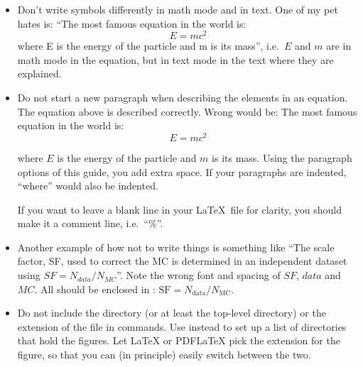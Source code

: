 \begin{itemize}
\item Don't write symbols differently in math mode and in text. One of
  my pet hates is:
  \enquote{The most famous equation in the world is:
  \begin{equation}
    \label{eq:emc1}
    E = m c^{2}
  \end{equation}
  where E is the energy of the particle and m is its mass}, i.e.\ \(E\)
  and \(m\) are in math mode in the equation, but in text mode in the
  text where they are explained.

\item Do not start a new paragraph when describing the elements in an equation.
  The equation above is described correctly. Wrong would be:
  The most famous equation in the world is:
  \begin{equation}
    \label{eq:emc2}
    E = m c^{2}
  \end{equation}

  \hspace*{1em}where \(E\) is the energy of the particle and \(m\) is its mass.
  Using the paragraph options of this guide, you add extra space.
  If your paragraphs are indented, \enquote{where} would also be indented.

  If you want to leave a blank line in your \LaTeX\ file for clarity,
  you should make it a comment line, i.e.\ \enquote{\%}.

\item Another example of how not to write things is something like
  \enquote{The scale factor, SF, used to correct the MC is determined in
  an independent dataset using \(SF = N_{data} / N_{MC}\)}. Note the
  wrong font and spacing of \(SF\), \(data\) and \(MC\). All should be
  enclosed in : \(\text{SF} = N_{\text{data}} / N_{\text{MC}}\).

\item Do not include the directory (or at least the top-level directory)
  or the extension of the file in  commands.
  Use 
  instead to set up a list of directories that hold the
  figures. Let \LaTeX{} or PDF\LaTeX{} pick
  the extension for the figure, so that you can (in principle) easily
  switch between the two.


\end{itemize}
